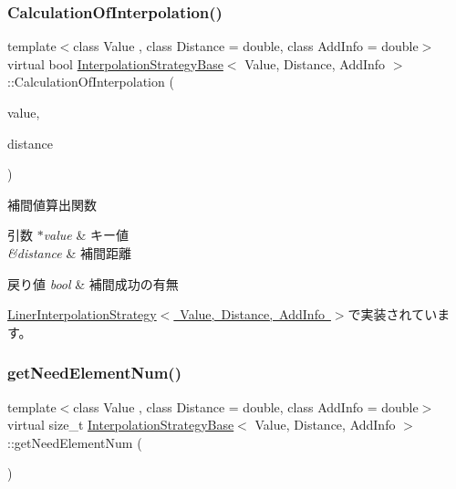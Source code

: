 \subsubsection{\texorpdfstring{Calculation\+Of\+Interpolation()}{CalculationOfInterpolation()}}
{\footnotesize\ttfamily template$<$class Value , class Distance  = double, class Add\+Info  = double$>$ \\
virtual bool \mbox{\hyperlink{class_interpolation_strategy_base}{Interpolation\+Strategy\+Base}}$<$ Value, Distance, Add\+Info $>$\+::Calculation\+Of\+Interpolation (\begin{DoxyParamCaption}\item[{Value $\ast$}]{value,  }\item[{Distance \&}]{distance }\end{DoxyParamCaption})\hspace{0.3cm}{\ttfamily [pure virtual]}}



補間値算出関数 


\begin{DoxyParams}{引数}
{\em $\ast$value} & キー値 \\
\hline
{\em \&distance} & 補間距離 \\
\hline
\end{DoxyParams}

\begin{DoxyRetVals}{戻り値}
{\em bool} & 補間成功の有無 \\
\hline
\end{DoxyRetVals}


\mbox{\hyperlink{class_liner_interpolation_strategy_a2474fcce1fb2eed6f9bdd8c95582d2b2}{Liner\+Interpolation\+Strategy$<$ Value, Distance, Add\+Info $>$}}で実装されています。

\mbox{\label{class_interpolation_strategy_base_a4d16fc821f0d503cc1fe4305022c4121}} 
\subsubsection{\texorpdfstring{get\+Need\+Element\+Num()}{getNeedElementNum()}}
{\footnotesize\ttfamily template$<$class Value , class Distance  = double, class Add\+Info  = double$>$ \\
virtual size\+\_\+t \mbox{\hyperlink{class_interpolation_strategy_base}{Interpolation\+Strategy\+Base}}$<$ Value, Distance, Add\+Info $>$\+::get\+Need\+Element\+Num (\begin{DoxyParamCaption}{ }\end{DoxyParamCaption})\hspace{0.3cm}{\ttfamily [pure virtual]}}



